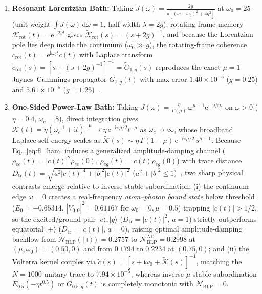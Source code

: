 \documentclass[twocolumn,10pt,amsmath,amssymb,floatfix]{revtex4-2}
\theoremstyle{plain}
\theoremstyle{definition}
\newcommand{\dd}{\mathrm{d}}
\newcommand{\ii}{\mathrm{i}}
\newcommand{\ee}{\mathrm{e}}
\newcommand{\NBLP}{\mathcal{N}_{\mathrm{BLP}}}
\begin{document}
\begin{enumerate}[leftmargin=1.4em,itemsep=2pt]
\item \textbf{Resonant Lorentzian Bath:} Taking $J(\omega) = \frac{2g}{\pi[(\omega-\omega_0)^2 + 4g^2]}$ at $\omega_0 = 25$ (unit weight $\int J(\omega)\,\dd\omega = 1$, half-width $\lambda = 2g$), rotating-frame memory $\mathcal{K}_{\mathrm{rot}}(t) = \ee^{-2gt}$ gives $\tilde{\mathcal{K}}_{\mathrm{rot}}(s) = (s+2g)^{-1}$, and because the Lorentzian pole lies deep inside the continuum ($\omega_0 \gg g$), the rotating-frame coherence $c_{\mathrm{rot}}(t) = \ee^{\ii\omega_0 t}c(t)$ with Laplace transform $\tilde{c}_{\mathrm{rot}}(s) = [s + (s+2g)^{-1}]^{-1} = \tilde{G}_{1,g}(s)$ reproduces the exact $\mu=1$ Jaynes--Cummings propagator $G_{1,g}(t)$ with max error $1.40 \times 10^{-5}$ ($g=0.25$) and $5.61 \times 10^{-5}$ ($g=1.25$)~\cite{Garraway1997PRA}.
\item \textbf{One-Sided Power-Law Bath:} Taking $J(\omega) = \frac{\eta}{\Gamma(\mu)}\,\omega^{\mu-1}\ee^{-\omega/\omega_c}$ on $\omega > 0$ ($\eta=0.4$, $\omega_c=8$), direct integration gives $\mathcal{K}(t) = \eta(\omega_c^{-1}+\ii t)^{-\mu} \to \eta\,\ee^{-\ii\pi\mu/2} t^{-\mu}$ as $\omega_c \to \infty$, whose broadband Laplace self-energy scales as $\tilde{\mathcal{K}}(s) \sim \eta\,\Gamma(1-\mu)\,\ee^{-\ii\pi\mu/2}\,s^{\mu-1}$. Because Eq.~\eqref{eq:fl_ham} induces a generalized amplitude-damping channel ($\rho_{ee}(t) = |c(t)|^2\rho_{ee}(0)$, $\rho_{eg}(t) = c(t)\rho_{eg}(0)$) with trace distance $D_{\mathrm{tr}}(t) = \sqrt{a^2|c(t)|^4 + |b|^2|c(t)|^2}$ ($a^2 + |b|^2 \le 1$)~\cite{Laine2010PRA}, two sharp physical contrasts emerge relative to inverse-stable subordination: (i) the continuum edge $\omega = 0$ creates a real-frequency \emph{atom--photon bound state} below threshold ($E_0 = -0.65314$, $|V_{0,0}|^2 = 0.61167$ for $\omega_0=0, \mu=0.5$) trapping $|c(t)| > 1/2$, so the excited/ground pair $|e\rangle, |g\rangle$ ($D_{\mathrm{tr}} = |c(t)|^2$, $a=1$) strictly outperforms equatorial $|\pm\rangle$ ($D_{\mathrm{tr}} = |c(t)|$, $a=0$), raising optimal amplitude-damping backflow from $\NBLP(|\pm\rangle) = 0.2757$ to $\NBLP^{\mathrm{AD}} = 0.2998$ at $(\mu,\omega_0) = (0.50,0)$ and from $0.1794$ to $0.2234$ at $(0.75,0)$; and (ii) the Volterra kernel couples via $\tilde{c}(s) = [s + \ii\omega_0 + \tilde{\mathcal{K}}(s)]^{-1}$, matching the $N=1000$ unitary trace to $7.94 \times 10^{-5}$, whereas inverse $\mu$-stable subordination $E_{0.5}(-\eta t^{0.5})$ or $G_{0.5,g}(t)$ is completely monotonic with $\NBLP = 0$.

\end{enumerate}
\end{document}
